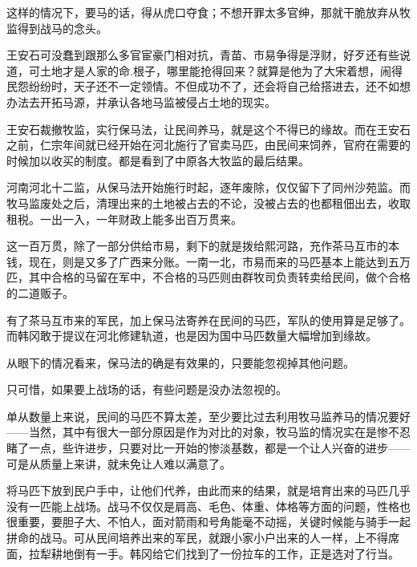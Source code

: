 这样的情况下，要马的话，得从虎口夺食；不想开罪太多官绅，那就干脆放弃从牧监得到战马的念头。

王安石可没蠢到跟那么多官宦豪门相对抗，青苗、市易争得是浮财，好歹还有些说道，可土地才是人家的命.根子，哪里能抢得回来？就算是他为了大宋着想，闹得民怨纷纷时，天子还不一定领情。不但成功不了，还会将自己给搭进去，还不如想办法去开拓马源，并承认各地马监被侵占土地的现实。

王安石裁撤牧监，实行保马法，让民间养马，就是这个不得已的缘故。而在王安石之前，仁宗年间就已经开始在河北施行了官卖马匹，由民间来饲养，官府在需要的时候加以收买的制度。都是看到了中原各大牧监的最后结果。

河南河北十二监，从保马法开始施行时起，逐年废除，仅仅留下了同州沙苑监。而牧马监废处之后，清理出来的土地被占去的不论，没被占去的也都租佃出去，收取租税。一出一入，一年财政上能多出百万贯来。

这一百万贯，除了一部分供给市易，剩下的就是拨给熙河路，充作茶马互市的本钱，现在，则是又多了广西来分账。一南一北，市易而来的马匹基本上能达到五万匹，其中合格的马留在军中，不合格的马匹则由群牧司负责转卖给民间，做个合格的二道贩子。

有了茶马互市来的军民，加上保马法寄养在民间的马匹，军队的使用算是足够了。而韩冈敢于提议在河北修建轨道，也是因为国中马匹数量大幅增加到缘故。

从眼下的情况看来，保马法的确是有效果的，只要能忽视掉其他问题。

只可惜，如果要上战场的话，有些问题是没办法忽视的。

单从数量上来说，民间的马匹不算太差，至少要比过去利用牧马监养马的情况要好——当然，其中有很大一部分原因是作为对比的对象，牧马监的情况实在是惨不忍睹了一点，些许进步，只要对比一开始的惨淡基数，都是一个让人兴奋的进步——可是从质量上来讲，就未免让人难以满意了。

将马匹下放到民户手中，让他们代养，由此而来的结果，就是培育出来的马匹几乎没有一匹能上战场。战马不仅仅是肩高、毛色、体重、体格等方面的问题，性格也很重要，要胆子大、不怕人，面对箭雨和号角能毫不动摇，关键时候能与骑手一起拼命的战马。可从民间培养出来的军民，就跟小家小户出来的人一样，上不得席面，拉犁耕地倒有一手。韩冈给它们找到了一份拉车的工作，正是选对了行当。

